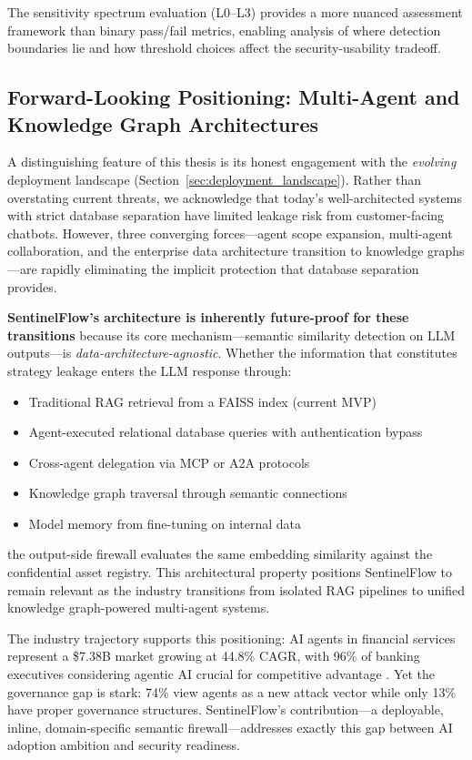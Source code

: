 \documentclass[12pt,a4paper]{article}
\begin{document}
The sensitivity spectrum evaluation (L0--L3) provides a more nuanced assessment framework than binary pass/fail metrics, enabling analysis of where detection boundaries lie and how threshold choices affect the security-usability tradeoff.


\subsection{Forward-Looking Positioning: Multi-Agent and Knowledge Graph Architectures}

A distinguishing feature of this thesis is its honest engagement with the \textit{evolving} deployment landscape (Section~\ref{sec:deployment_landscape}). Rather than overstating current threats, we acknowledge that today's well-architected systems with strict database separation have limited leakage risk from customer-facing chatbots. However, three converging forces---agent scope expansion, multi-agent collaboration, and the enterprise data architecture transition to knowledge graphs---are rapidly eliminating the implicit protection that database separation provides.

\textbf{SentinelFlow's architecture is inherently future-proof for these transitions} because its core mechanism---semantic similarity detection on LLM outputs---is \textit{data-architecture-agnostic}. Whether the information that constitutes strategy leakage enters the LLM response through:
\begin{itemize}[leftmargin=*]
    \item Traditional RAG retrieval from a FAISS index (current MVP)
    \item Agent-executed relational database queries with authentication bypass
    \item Cross-agent delegation via MCP or A2A protocols
    \item Knowledge graph traversal through semantic connections
    \item Model memory from fine-tuning on internal data
\end{itemize}
the output-side firewall evaluates the same embedding similarity against the confidential asset registry. This architectural property positions SentinelFlow to remain relevant as the industry transitions from isolated RAG pipelines to unified knowledge graph-powered multi-agent systems.

The industry trajectory supports this positioning: AI agents in financial services represent a \$7.38B market growing at 44.8\% CAGR, with 96\% of banking executives considering agentic AI crucial for competitive advantage \cite{nightfall_securing_agents}. Yet the governance gap is stark: 74\% view agents as a new attack vector while only 13\% have proper governance structures. SentinelFlow's contribution---a deployable, inline, domain-specific semantic firewall---addresses exactly this gap between AI adoption ambition and security readiness.
\end{document}
